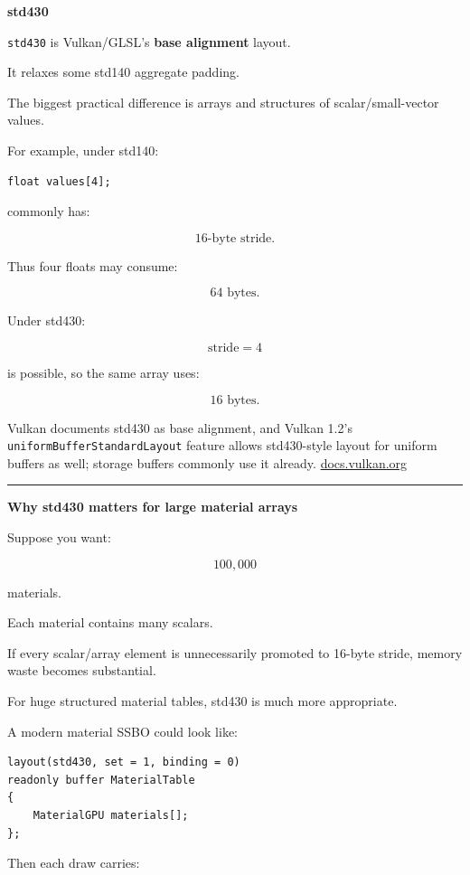 \textbf{std430}

\texttt{std430} is Vulkan/GLSL's \textbf{base alignment} layout.

It relaxes some std140 aggregate padding.

The biggest practical difference is arrays and structures of scalar/small-vector values.

For example, under std140:

\begin{verbatim}
float values[4];
\end{verbatim}

commonly has:

\[
16\text{-byte stride}.
\]

Thus four floats may consume:

\[
64\text{ bytes}.
\]

Under std430:

\[
\text{stride}=4
\]

is possible, so the same array uses:

\[
16\text{ bytes}.
\]

Vulkan documents std430 as base alignment, and Vulkan 1.2's \texttt{uniformBufferStandardLayout} feature allows std430-style layout for uniform buffers as well; storage buffers commonly use it already. \href{https://docs.vulkan.org/guide/latest/shader_memory_layout.html?utm_source=chatgpt.com}{docs.vulkan.org}

\begin{center}\rule{0.5\linewidth}{0.5pt}\end{center}

\textbf{Why std430 matters for large material arrays}

Suppose you want:

\[
100,000
\]

materials.

Each material contains many scalars.

If every scalar/array element is unnecessarily promoted to 16-byte stride, memory waste becomes substantial.

For huge structured material tables, std430 is much more appropriate.

A modern material SSBO could look like:

\begin{verbatim}
layout(std430, set = 1, binding = 0)
readonly buffer MaterialTable
{
    MaterialGPU materials[];
};
\end{verbatim}

Then each draw carries:

